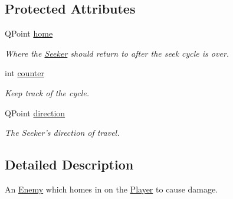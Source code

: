\subsection*{Protected Attributes}
\begin{DoxyCompactItemize}
\item 
\hypertarget{classSeeker_a6b6fb611df975d01f9bba2aadc1c1748}{
QPoint \hyperlink{classSeeker_a6b6fb611df975d01f9bba2aadc1c1748}{home}}
\label{classSeeker_a6b6fb611df975d01f9bba2aadc1c1748}

\begin{DoxyCompactList}\small\item\em Where the \hyperlink{classSeeker}{Seeker} should return to after the seek cycle is over. \end{DoxyCompactList}\item 
\hypertarget{classSeeker_a5907cafef7b9944c0acdff81e53813b0}{
int \hyperlink{classSeeker_a5907cafef7b9944c0acdff81e53813b0}{counter}}
\label{classSeeker_a5907cafef7b9944c0acdff81e53813b0}

\begin{DoxyCompactList}\small\item\em Keep track of the cycle. \end{DoxyCompactList}\item 
\hypertarget{classSeeker_a6fe90c18b87d5c788872a287cd339271}{
QPoint \hyperlink{classSeeker_a6fe90c18b87d5c788872a287cd339271}{direction}}
\label{classSeeker_a6fe90c18b87d5c788872a287cd339271}

\begin{DoxyCompactList}\small\item\em The Seeker's direction of travel. \end{DoxyCompactList}\end{DoxyCompactItemize}


\subsection{Detailed Description}
An \hyperlink{classEnemy}{Enemy} which homes in on the \hyperlink{classPlayer}{Player} to cause damage. 


